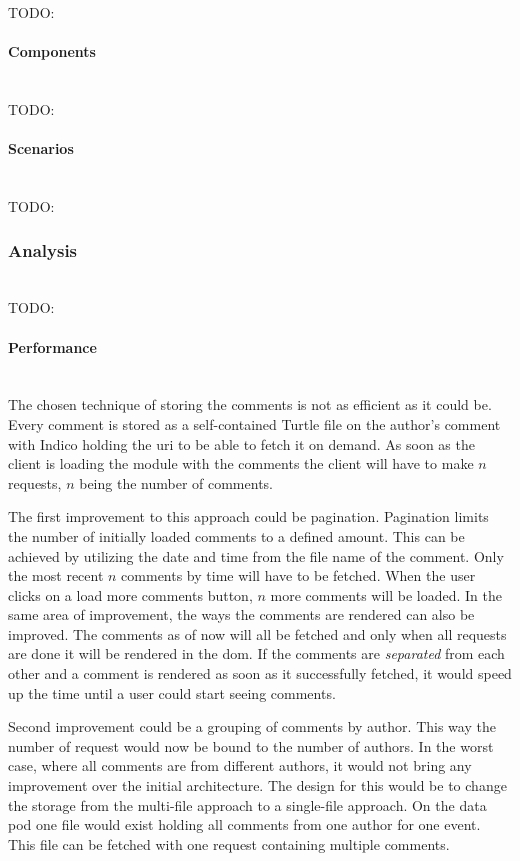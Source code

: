 TODO:
\vspace{0.5cm}
\paragraph{Components}\mbox{}\\

TODO:
\vspace{0.5cm}
\paragraph{Scenarios}\mbox{}\\

TODO:
\subsubsection{Analysis}\mbox{}\\

TODO:
\vspace{0.5cm}
\paragraph{Performance}\mbox{}\\

The chosen technique of storing the comments is not as efficient as it could be. Every comment is stored as a self-contained Turtle file on the author's comment with Indico holding the \gls{uri} to be able to fetch it on demand. As soon as the client is loading the module with the comments the client will have to make $n$ requests, $n$ being the number of comments.

The first improvement to this approach could be pagination. Pagination limits the number of initially loaded comments to a defined amount. This can be achieved by utilizing the date and time from the file name of the comment. Only the most recent $n$ comments by time will have to be fetched. When the user clicks on a load more comments button, $n$ more comments will be loaded.
In the same area of improvement, the ways the comments are rendered can also be improved. The comments as of now will all be fetched and only when all requests are done it will be rendered in the \gls{dom}. If the comments are \textit{separated} from each other and a comment is rendered as soon as it successfully fetched, it would speed up the time until a user could start seeing comments.

Second improvement could be a grouping of comments by author. This way the number of request would now be bound to the number of authors. In the worst case, where all comments are from different authors, it would not bring any improvement over the initial architecture. The design for this would be to change the storage from the multi-file approach to a single-file approach. On the data pod one file would exist holding all comments from one author for one event. This file can be fetched with one request containing multiple comments.

